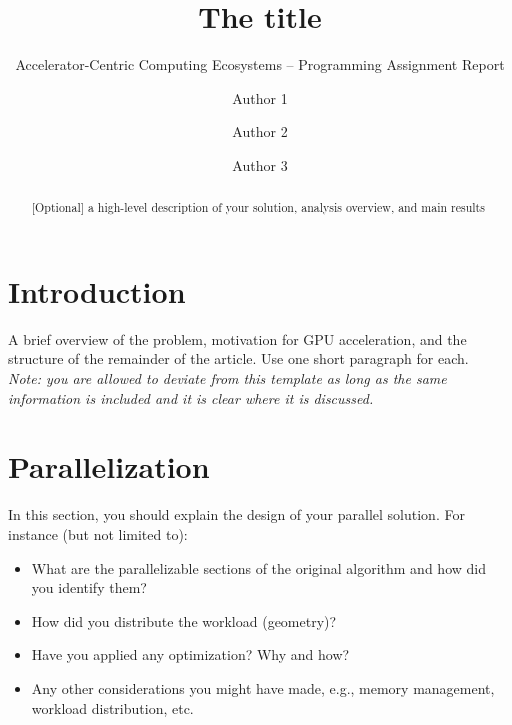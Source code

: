 \documentclass[sigconf, nonacm, review]{acmart}
\begin{document}
\title{The title}
\subtitle{Accelerator-Centric Computing Ecosystems -- Programming Assignment Report }



\author{Author 1}

\author{Author 2}
\author{Author 3}


\begin{abstract}
  [Optional]  a high-level description of your solution, analysis overview, and main results
\end{abstract}




\maketitle

\section{Introduction}
A brief overview of the problem, motivation for GPU acceleration, and the structure of the remainder of the article. Use one short paragraph for each.\\

\noindent
\textit{Note: you are allowed to deviate from this template as long as the same information is included and it is clear where it is discussed.}

\section{Parallelization}
In this section, you should explain the design of your parallel solution. For instance (but not limited to):
\begin{itemize} 
\item What are the parallelizable sections of the original algorithm and how did you identify them? 
\item How did you distribute the workload (geometry)?
\item Have you applied any optimization? Why and how?
\item Any other considerations you might have made, e.g., memory management, workload distribution, etc.
\end{itemize}
\end{document}
